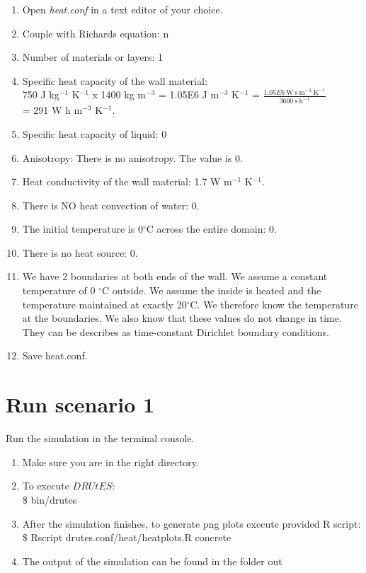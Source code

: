 \begin{enumerate}
\item Open \emph{heat.conf} in a text editor of your choice. 

\item Couple with Richards equation: n
\item Number of materials or layers: 1 
\item Specific heat capacity of the wall material: \\750 J kg$^{-1}$ K$^{-1}$ x 1400 kg m$^{-3}$ = 1.05E6 J m$^{-3}$ K$^{-1}$ = $\frac{1.05E6~\mathrm{W~s~m^{-3}~K^{-1}}}{3600~\mathrm{s~h^{-1}}}$ \\= 291 W h m$^{-3}$ K$^{-1}$. 
\item Specific heat capacity of liquid: 0
\item Anisotropy: There is no anisotropy. The value is 0.
\item Heat conductivity of the wall material: 1.7 W m$^{-1}$ K$^{-1}$. 
\item There is NO heat convection of water: 0.
\item The initial temperature is 0$^{\circ}$C across the entire domain: 0.
\item There is no heat source: 0. 
\item We have 2 boundaries at both ends of the wall. We assume a constant temperature of 0 $^{\circ}$C outside. We assume the inside is heated and the temperature maintained at exactly 20$^{\circ}$C. We therefore know the temperature at the boundaries. We also know that these values do not change in time. They can be describes as time-constant Dirichlet boundary conditions. \\

\item Save heat.conf.
\end{enumerate}

\section*{Run scenario 1}
Run the simulation in the terminal console.
\begin{enumerate}
\item Make sure you are in the right directory. 
\item To execute $DRUtES$: \\
\$ bin/drutes
\item After the simulation finishes, to generate png plots execute provided R script: \\
\$ Rscript drutes.conf/heat/heatplots.R concrete
\item The output of the simulation can be found in the folder out
\end{enumerate}

